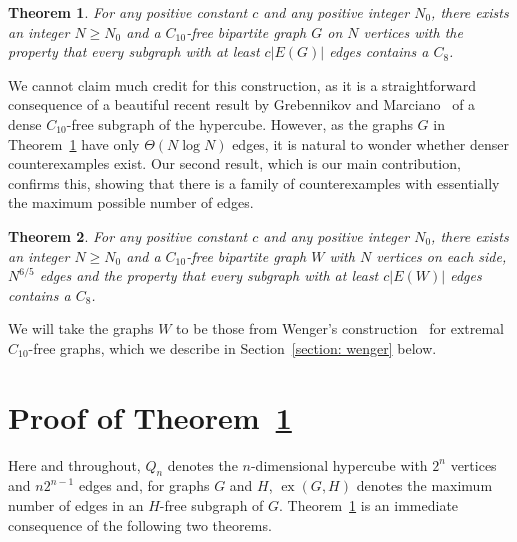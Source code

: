 \documentclass[A4paper,reqno,oneside,11pt]{amsart}
\theoremstyle{plain}
\newtheorem{theorem}{Theorem}[section]
\theoremstyle{definition}
\newcommand{\ex}{\operatorname{ex}}
\begin{document}
\begin{theorem}
\label{thm: hypercube}
    For any positive constant $c$ and any positive integer $N_0$, there exists an integer $N \geq N_0$ and a $C_{10}$-free bipartite graph $G$ on $N$ vertices with the property that every subgraph with at least $c|E(G)|$ edges contains a $C_8$.
\end{theorem}

\noindent 
We cannot claim much credit for this construction, as it is a straightforward consequence of a beautiful recent result by Grebennikov and Marciano~\cite{GM25} of a dense $C_{10}$-free subgraph of the hypercube. 
However, as the graphs $G$ in Theorem~\ref{thm: hypercube} have only $\Theta(N \log N)$ edges, it is natural to wonder whether denser counterexamples exist.
Our second result, which is our main contribution, confirms this, showing that there is a family of counterexamples with essentially the maximum possible number of edges. 


\begin{theorem}
\label{thm: wenger}
    For any positive constant $c$ and any positive integer $N_0$, there exists an integer $N \geq N_0$ and a 
    $C_{10}$-free bipartite graph $W$ with $N$ vertices on each side, $N^{6/5}$ edges and the property that every subgraph with at least $c|E(W)|$ edges contains a $C_8$.
\end{theorem}

\noindent
We will take the graphs $W$ to be those from Wenger's construction~\cite{Wenger} for extremal $C_{10}$-free graphs, which we describe in Section~\ref{section: wenger} below.


\section{Proof of Theorem~\ref{thm: hypercube}}
\label{section: hypercube}

Here and throughout, $Q_n$ denotes the $n$-dimensional hypercube with $2^n$ vertices and $n 2^{n-1}$ edges and, for graphs $G$ and $H$, $\ex(G,H)$ denotes the maximum number of edges in an $H$-free subgraph of $G$.
Theorem~\ref{thm: hypercube} is an immediate consequence of the following two theorems.
\end{document}
